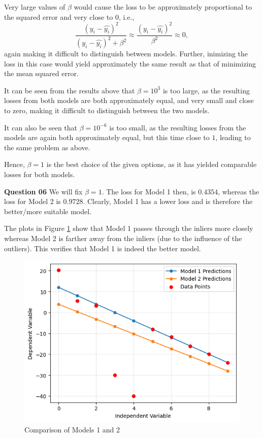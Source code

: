 \documentclass{article}[a4paper]
\begin{document}
	Very large values of $\beta$ would cause the loss to be approximately proportional to the squared error and
	very close to $0$, i.e., \[
		\dfrac{\left( y_i - \hat{y_i} \right)^2}{\left( y_i - \hat{y_i} \right)^2 + \beta^2}
		\approx
		\dfrac{\left( y_i - \hat{y_i} \right)^2}{\beta^2}
		\approx
		0,
	\] again making it difficult to distinguish between models. Further, inimizing the loss in this
	case would yield approximately the same result as that of minimizing the mean squared error.
	\newline

	It can be seen from the results above that $\beta = 10^3$ is too large, as the resulting losses from both
	models are both approximately equal, and very small and close to zero, making it difficult to distinguish
	between the two models.
	\newline

	It can also be seen that $\beta = 10^{-6}$ is too small, as the resulting losses from the models are again both
	approximately equal, but this time close to $1$, leading to the same problem as above.
	\newline

	Hence, $\beta = 1$ is the best choice of the given options, as it has yielded comparable losses for both
	models.
	\newline

	\textbf{Question 06} We will fix $\beta = 1$. The loss for Model 1 then, is $0.4354$, whereas the loss
	for Model 2 is $0.9728$. Clearly, Model 1 has a lower loss and is therefore the better/more suitable model.
	\newline

	The plots in Figure \ref{q1_4_img} show that Model 1 passes through the inliers more closely whereas Model 2 is farther away
	from the inliers (due to the influence of the outliers). This verifies that Model 1 is indeed the better model.

	\begin{figure}[H]
		\centering
		\includegraphics[width=0.9\linewidth]{images/q1_4.png}
		\caption{Comparison of Models 1 and 2}
		\label{q1_4_img}
	\end{figure}
\end{document}
